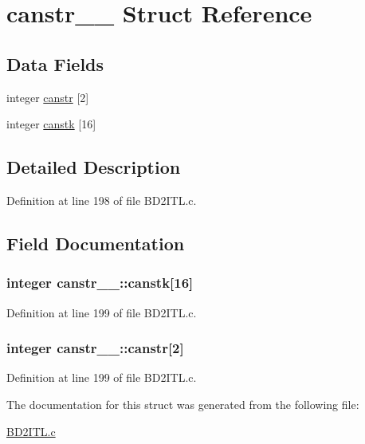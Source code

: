 \hypertarget{structcanstr__1__}{}\section{canstr\+\_\+\_\+ Struct Reference}
\label{structcanstr__1__}
\subsection*{Data Fields}
\begin{DoxyCompactItemize}
\item 
integer \hyperlink{structcanstr__1___a5d76fbba803fae1af89ee5f8b0ee7de5}{canstr} \mbox{[}2\mbox{]}
\item 
integer \hyperlink{structcanstr__1___ae274a84ab7a05e9532b6e60721526811}{canstk} \mbox{[}16\mbox{]}
\end{DoxyCompactItemize}


\subsection{Detailed Description}


Definition at line 198 of file B\+D2\+I\+T\+L.\+c.



\subsection{Field Documentation}
\subsubsection[{\texorpdfstring{canstk}{canstk}}]{\setlength{\rightskip}{0pt plus 5cm}integer canstr\+\_\+\_\+\+::canstk\mbox{[}16\mbox{]}}\hypertarget{structcanstr__1___ae274a84ab7a05e9532b6e60721526811}{}\label{structcanstr__1___ae274a84ab7a05e9532b6e60721526811}


Definition at line 199 of file B\+D2\+I\+T\+L.\+c.

\subsubsection[{\texorpdfstring{canstr}{canstr}}]{\setlength{\rightskip}{0pt plus 5cm}integer canstr\+\_\+\_\+\+::canstr\mbox{[}2\mbox{]}}\hypertarget{structcanstr__1___a5d76fbba803fae1af89ee5f8b0ee7de5}{}\label{structcanstr__1___a5d76fbba803fae1af89ee5f8b0ee7de5}


Definition at line 199 of file B\+D2\+I\+T\+L.\+c.



The documentation for this struct was generated from the following file\+:\begin{DoxyCompactItemize}
\item 
\hyperlink{BD2ITL_8c}{B\+D2\+I\+T\+L.\+c}\end{DoxyCompactItemize}
